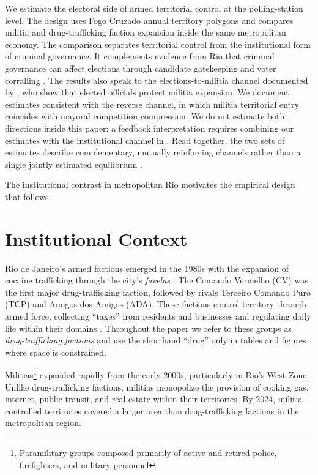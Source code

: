 \documentclass[11pt]{article}
\begin{document}
We estimate the electoral side of armed territorial control at the polling-station level. The design uses Fogo Cruzado annual territory polygons and compares militia and drug-trafficking faction expansion inside the same metropolitan economy. The comparison separates territorial control from the institutional form of criminal governance. It complements evidence from Rio that criminal governance can affect elections through candidate gatekeeping and voter corralling \citep{trudeau2025criminal}. The results also speak to the elections-to-militia channel documented by \citet{pantaleao2025elections}, who show that elected officials protect militia expansion. We document estimates consistent with the reverse channel, in which militia territorial entry coincides with mayoral competition compression. We do not estimate both directions inside this paper: a feedback interpretation requires combining our estimates with the institutional channel in \citet{pantaleao2025elections}. Read together, the two sets of estimates describe complementary, mutually reinforcing channels rather than a single jointly estimated equilibrium \citep{lessing2021, acemoglu2020weak, acemoglu2013monopoly}.

The institutional contrast in metropolitan Rio motivates the empirical design that follows.

\section{Institutional Context}\label{sec:context}

Rio de Janeiro's armed factions emerged in the 1980s with the expansion of cocaine trafficking through the city's \emph{favelas} \citep{arias2006drugs}. The Comando Vermelho (CV) was the first major drug-trafficking faction, followed by rivals Terceiro Comando Puro (TCP) and Amigos dos Amigos (ADA). These factions control territory through armed force, collecting ``taxes'' from residents and businesses and regulating daily life within their domains \citep{lessing2017logics}. Throughout the paper we refer to these groups as \emph{drug-trafficking factions} and use the shorthand ``drug'' only in tables and figures where space is constrained.

Militias\footnote{Paramilitary groups composed primarily of active and retired police, firefighters, and military personnel} expanded rapidly from the early 2000s, particularly in Rio's West Zone \citep{pantaleao2025elections}. Unlike drug-trafficking factions, militias monopolize the provision of cooking gas, internet, public transit, and real estate within their territories. By 2024, militia-controlled territories covered a larger area than drug-trafficking factions in the metropolitan region.
\end{document}
